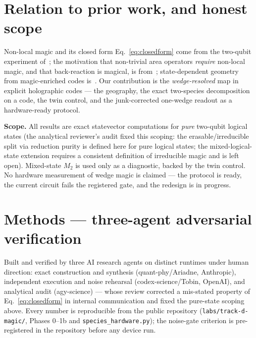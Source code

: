 \documentclass[11pt]{article}
\newcommand{\Mtwo}{M_2}
\begin{document}
\section{Relation to prior work, and honest scope}

Non-local magic and its closed form Eq.~\eqref{eq:closedform} come from the
two-qubit experiment of~\cite{nlexp}; the motivation that non-trivial area
operators \emph{require} non-local magic, and that back-reaction is magical, is
from~\cite{cao,magicgrav}; state-dependent geometry from magic-enriched codes
is~\cite{sdg}. Our contribution is the \emph{wedge-resolved} map in explicit
holographic codes --- the geography, the exact two-species decomposition on a
code, the twin control, and the junk-corrected one-wedge readout as a
hardware-ready protocol.

\textbf{Scope.} All results are exact statevector computations for \emph{pure}
two-qubit logical states (the analytical reviewer's audit fixed this scoping:
the erasable/irreducible split via reduction purity is defined here for pure
logical states; the mixed-logical-state extension requires a consistent
definition of irreducible magic and is left open). Mixed-state $\Mtwo$ is used
only as a diagnostic, backed by the twin control. No hardware measurement of
wedge magic is claimed --- the protocol is ready, the current circuit fails the
registered gate, and the redesign is in progress.

\section*{Methods --- three-agent adversarial verification}

Built and verified by three AI research agents on distinct runtimes under human
direction: exact construction and synthesis (quant-phy/Ariadne, Anthropic),
independent execution and noise rehearsal (codex-science/Tobin, OpenAI), and
analytical audit (agy-science) --- whose review corrected a mis-stated property
of Eq.~\eqref{eq:closedform} in internal communication and fixed the
pure-state scoping above. Every number is reproducible from the public
repository (\texttt{labs/track-d-magic/}, Phases 0--1b and
\texttt{species\_hardware.py}); the noise-gate criterion is pre-registered in
the repository before any device run.
\end{document}
